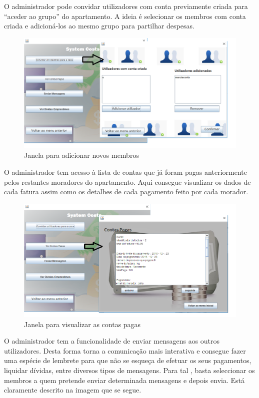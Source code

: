 \newpage

O administrador pode convidar utilizadores com conta previamente criada para “aceder ao grupo” do apartamento. A ideia é selecionar os membros com conta criada e adicioná-los ao mesmo grupo para partilhar despesas.

\begin{figure}[h!]
	\centering
	\includegraphics[scale=0.6]{imagens/interface/botaoadicionamorador}  
	\caption{Janela para adicionar novos membros}  
\end{figure}

O administrador tem acesso à lista de contas que já foram pagas anteriormente pelos restantes moradores do apartamento. Aqui consegue visualizar os dados de cada fatura assim como os detalhes de cada pagamento feito por cada morador.

\begin{figure}[h!]
	\centering
	\includegraphics[scale=0.6]{imagens/interface/adminvercontaspagas}  
	\caption{Janela para visualizar as contas pagas}  
\end{figure}

\newpage \clearpage

O administrador tem a funcionalidade de enviar mensagens aos outros utilizadores. Desta forma torna a comunicação mais interativa e consegue fazer uma espécie de lembrete para que não se esqueça de efetuar os seus pagamentos, liquidar dívidas, entre diversos tipos de mensagens. Para tal , basta seleccionar os membros a quem pretende enviar determinada mensagens e depois envia. Está claramente descrito na imagem que se segue. 

